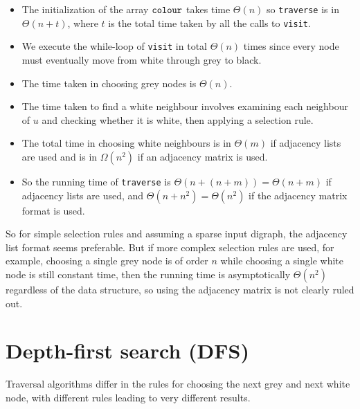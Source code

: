 
\begin{itemize}
  \item The initialization of the array $\operatorname{\text{\texttt{colour}}}$ takes time $\Theta(n)$ so \texttt{traverse} 
  is in $\Theta(n + t)$, where $t$ is the total time taken by all the calls to \texttt{visit}.
  \item We execute the while-loop of \texttt{visit} in total $\Theta(n)$ times 
  since every node must eventually move from white through grey to black. 
  \item The time taken in choosing grey nodes is $\Theta(n)$. 
  \item The time taken to find a white neighbour involves examining each neighbour of $u$ 
  and checking whether it is white, then applying a selection rule. 
  \item The total time in choosing white neighbours is in $\Theta(m)$ if adjacency lists are used 
  and is in $\Omega(n^2)$ if an adjacency matrix is used.
  \item So the running time of \texttt{traverse} is $\Theta(n + (n+m)) = \Theta(n + m)$
  if adjacency lists are used, and $\Theta(n + n^2) = \Theta(n^2)$ if the adjacency matrix format is used.
\end{itemize}

So for simple selection rules and assuming a sparse input digraph, the adjacency list format seems
preferable. But if more complex selection rules are used, for example, choosing a single grey node is 
of order $n$ while choosing a single white node is still constant time, then the running time is 
asymptotically $\Theta(n^2)$ regardless of the data structure, so using
the adjacency matrix is not clearly ruled out.


\chapter{Depth-first search (DFS)} %
Traversal algorithms differ in the rules for choosing the next grey and next white node, 
with different rules leading to very different results.

